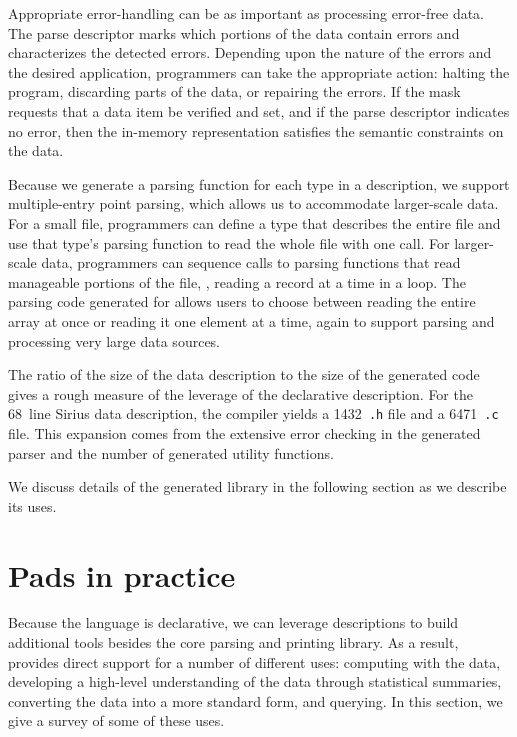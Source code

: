 \documentclass{sig-alternate}
\newcommand{\dibbler}{Sirius}
\begin{document}
Appropriate error-handling can be as important as processing
error-free data.  The parse descriptor marks which portions of the
data contain errors and characterizes the detected errors.
Depending upon the nature of the errors and the desired application,
programmers can take the appropriate action: halting the program,
discarding parts of the data, or repairing the errors.
If the mask requests
that a data item be verified and set, and if the parse descriptor
indicates no error, then the in-memory representation satisfies the
semantic constraints on the data.

Because we generate a parsing function for each type in a \pads{} description,
we support multiple-entry point parsing, which allows us to 
accommodate larger-scale data.
For a small file, programmers can define a \pads{} type that describes
the entire file and use that type's parsing function to read the whole
file with one call.  For larger-scale data, programmers can sequence
calls to parsing functions that read manageable portions of the file,
\eg{}, reading a record at a time in a loop.  The parsing code generated
for  allows users to choose between reading the entire array
at once or reading it one element at a time, again to support parsing
and processing very large data sources.

The ratio of the size of the data description to the size of the generated code gives a rough measure of the leverage of the
declarative description.  For the 
68~line \dibbler{} data description, the compiler yields a 1432~\texttt{.h} file
and a 6471~\texttt{.c} file.  This expansion comes from the extensive error checking in the generated parser and the number of generated utility functions.

We discuss details of the generated library in the following section
as we describe its uses.

\section{Pads in practice}
Because the \pads{} language is declarative, we can leverage \pads{}
descriptions to build additional tools besides the core parsing and printing
library.  As a result, \pads{} provides direct support for a number
of different uses: computing with the data, developing a high-level
understanding of the data through statistical summaries, converting the data into a more standard form, and querying.  In this section, we give a survey of some of these uses.
\end{document}
